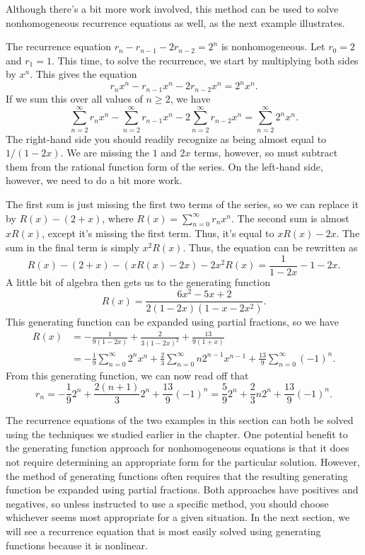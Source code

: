 Although there's a bit more work involved, this method can be used to
solve nonhomogeneous recurrence equations as well, as the next example
illustrates.

\begin{example}\label{ex:recurrence:gf-nonhomog}
  The recurrence equation $r_n - r_{n-1}-2r_{n-2} = 2^n$ is
  nonhomogeneous. Let $r_0=2$ and $r_1=1$. This time, to solve the
  recurrence, we start by multiplying both sides by $x^n$. This gives
  the equation
  \[r_nx^n - r_{n-1}x^n-2r_{n-2}x^n = 2^nx^n.\]
  If we sum this over all values of $n\geq 2$, we have
  \[\sum_{n=2}^\infty r_nx^n - \sum_{n=2}^\infty r_{n-1}x^n-2
  \sum_{n=2}^\infty r_{n-2}x^n = \sum_{n=2}^\infty 2^nx^n.\]
  The right-hand side you should readily recognize as being almost equal to
  $1/(1-2x)$. We are missing the $1$ and $2x$ terms, however, so
  must subtract them from the rational function form of the series. On the left-hand side, however, we need to do a bit more
  work.

  The first sum is just missing the first two terms of the series, so
  we can replace it by $R(x) - (2+x)$, where $R(x)=\sum_{n=0}^\infty
  r_n x^n$. The second sum is almost $xR(x)$, except it's missing the
  first term. Thus, it's equal to $xR(x) - 2x$. The sum in the final
  term is simply $x^2 R(x)$. Thus, the equation can be rewritten as
  \[R(x) - (2+x) -(xR(x)-2x)-2x^2R(x) = \frac{1}{1-2x} - 1- 2x.\]
  A little bit of algebra then gets us to the generating function
  \[R(x) = \frac{6x^2-5x+2}{2(1-2x)(1-x-2x^2)}.\]
  This generating function can be expanded using partial fractions, so
  we have
  \begin{align*}
    R(x) &= -\frac{1}{9(1-2x)} + \frac{2}{3(1-2x)^2} +
    \frac{13}{9(1+x)}\\ 
    &= -\frac{1}{9} \sum_{n=0}^\infty 2^nx^n +
    \frac{2}{3}\sum_{n=0}^\infty n2^{n-1} x^{n-1} +
    \frac{13}{9}\sum_{n=0}^\infty (-1)^n.\end{align*}
  From this generating function, we can now read off that
  \[r_n = -\frac{1}{9}2^n + \frac{2(n+1)}{3}2^{n} + \frac{13}{9}(-1)^n =
  \frac{5}{9} 2^n + \frac{2}{3}n2^n + \frac{13}{9}(-1)^n.\]
\end{example}

The recurrence equations of the two examples in this section can both
be solved using the techniques we studied earlier in the chapter. One
potential benefit to the generating function approach for
nonhomogeneous equations is that it does not require determining an
appropriate form for the particular solution. However, the method of
generating functions often requires that the resulting generating
function be expanded using partial fractions. Both approaches have
positives and negatives, so unless instructed to use a specific
method, you should choose whichever seems most appropriate for a given
situation. In the next section, we will see a recurrence equation that
is most easily solved using generating functions because it is
nonlinear.

